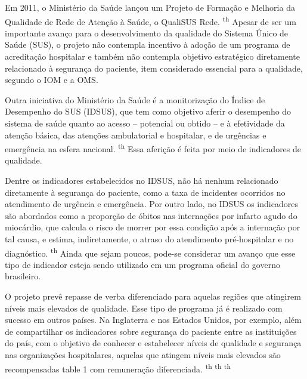 \documentclass{article}
\begin{document}
Em 2011, o Ministério da Saúde lançou um Projeto de Formação e Melhoria da
Qualidade de
Rede de Atenção à Saúde, o QualiSUS Rede. \textsuperscript{th}
Apesar de ser um importante avanço para o desenvolvimento da qualidade do
Sistema
Único de Saúde (SUS), o projeto não contempla incentivo à adoção de um programa
de
acreditação hospitalar e também não contempla objetivo estratégico diretamente
relacionado à
segurança do paciente, item considerado essencial para a qualidade, segundo o
IOM e a
OMS.

Outra iniciativa do Ministério da Saúde é a monitorização do Índice de
Desempenho do SUS
(IDSUS), que tem como objetivo aferir o desempenho do sistema de saúde quanto ao
acesso –
potencial ou obtido – e à efetividade da atenção básica, das atenções
ambulatorial e
hospitalar, e de urgências e emergência na esfera nacional. \textsuperscript{th}
Essa aferição é feita por meio de indicadores de qualidade.

Dentre os indicadores estabelecidos no IDSUS, não há nenhum relacionado
diretamente à
segurança do paciente, como a taxa de incidentes ocorridos no atendimento de
urgência e
emergência. Por outro lado, no IDSUS os indicadores são abordados como a
proporção de óbitos
nas internações por infarto agudo do miocárdio, que calcula o risco de morrer
por essa
condição após a internação por tal causa, e estima, indiretamente, o atraso do
atendimento
pré-hospitalar e no diagnóstico. \textsuperscript{th}
Ainda que sejam poucos, pode-se considerar um avanço que esse tipo de indicador
esteja sendo utilizado em um programa oficial do governo brasileiro.

O projeto prevê repasse de verba diferenciado para aquelas regiões que atingirem
níveis
mais elevados de qualidade. Esse tipo de programa já é realizado com sucesso em
outros
países. Na Inglaterra e nos Estados Unidos, por exemplo, além de compartilhar os
indicadores
sobre segurança do paciente entre as instituições do país, com o objetivo de
conhecer e
estabelecer níveis de qualidade e segurança nas organizações hospitalares,
aquelas que
atingem níveis mais elevados são recompensadas table 1 com remuneração
diferenciada. \textsuperscript{th}
\textsuperscript{th}
\textsuperscript{th}
\end{document}
